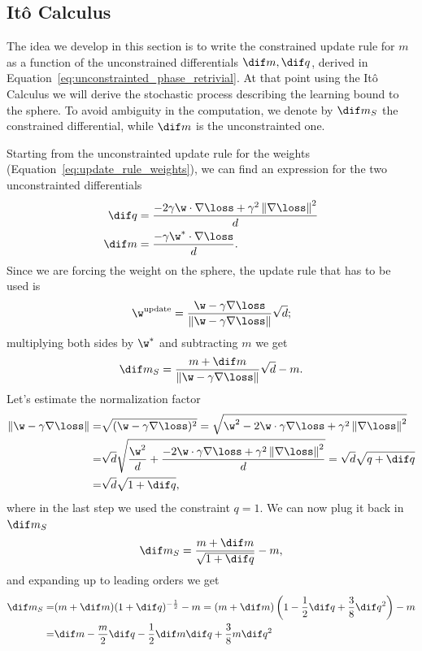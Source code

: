 \subsection{Itô Calculus}

The idea we develop in this section is to write the constrained update rule for \(m\) as a function of the unconstrained differentials \(\dif m, \dif q\),
derived in Equation~\eqref{eq:unconstrainted_phase_retrivial}.
At that point using the Itô Calculus we will derive the stochastic process describing the learning bound to the sphere.
To avoid ambiguity in the computation, we denote by \(\dif m_S\) the constrained differential, while \(\dif m\) is the unconstrainted one.

Starting from the unconstrainted update rule for the weights (Equation~\eqref{eq:update_rule_weights}),
we can find an expression for the two unconstrainted differentials
\[\begin{split}
  \dif q &= \frac{-2\gamma \w\cdot\nabla{\loss} + \gamma^2\left\|\nabla{\loss}\right\|^2}{d} \\
  \dif m &= \frac{-\gamma \w^*\cdot\nabla\loss}{d}.
\end{split}\]
Since we are forcing the weight on the sphere, the update rule that has to be used is
\[
  \w^\text{update} =\frac{\w - \gamma \nabla{\loss}}{\left\|\w - \gamma \nabla{\loss}\right\|}\sqrt{d};
\]
multiplying both sides by \(\w^*\) and subtracting \(m\) we get
\[
  \dif m_S = \frac{m +\dif m}{\left\|\w - \gamma \nabla{\loss}\right\|}\sqrt{d} - m.
\]
Let's estimate the normalization factor
\[
  \begin{split}
  \left\|\w - \gamma \nabla{\loss}\right\| =& \sqrt{(\w - \gamma \nabla{\loss})^2}
                                           =  \sqrt{\w^2 - 2\w\cdot\gamma \nabla{\loss}+\gamma^2\left\|\nabla{\loss}\right\|^2} \\
                                           =& \sqrt{d}\sqrt{\frac{\w^2}{d} + \frac{- 2\w\cdot\gamma \nabla{\loss}+\gamma^2\left\|\nabla{\loss}\right\|^2}{d}}
                                           = \sqrt{d}\sqrt{q +\dif q} \\
                                           =& \sqrt{d}\sqrt{1 +\dif q},
  \end{split}
\]
where in the last step we used the constraint \(q=1\). We can now plug it back in \(\dif m_S\)
\[
  \dif m_S = \frac{m +\dif m}{\sqrt{1 +\dif q}} - m,
\]
and expanding up to leading orders we get
\[\begin{split}
  \dif m_S =& (m +\dif m)(1 +\dif q)^{-\frac12} - m = (m +\dif m)\left(1 -\frac12\dif q + \frac38\dif q^2\right)-m \\
           =& \dif m - \frac{m}{2}\dif q -\frac12 \dif m \dif q + \frac38 m \dif q^2
\end{split}\]
